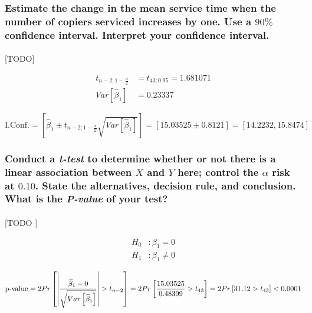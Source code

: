 \documentclass{article}
\begin{document}
      \subsubsection{Estimate the change in the mean service time when the number of copiers serviced increases by one. Use a $90\%$ confidence interval. Interpret your confidence interval.}
      \label{sec:copiers-2.5a}

        \paragraph{}
        [TODO]

        \begin{align}
          t_{n-2;1-\frac{\alpha}{2}} &= t_{43;0.95} = 1.681071\\
          Var\left[\widehat{\beta}_1\right] &= 0.23337
        \end{align}

        \begin{equation}
          \text{I.Conf.}
          = \left[\widehat{\beta}_1 \pm t_{n-2;1-\frac{\alpha}{2}}\sqrt{Var\left[\widehat{\beta}_1\right]}\right]
          = \left[15.03525 \pm 0.8121\right]
          = \left[14.2232, 15.8474\right]
        \end{equation}

      \subsubsection{Conduct a \emph{t-test} to determine whether or not there is a linear association between $X$ and $Y$ here; control the $\alpha$ risk at $0.10$. State the alternatives, decision rule, and conclusion. What is the \emph{P-value} of your test?}
      \label{sec:copiers-2.5b}

        \paragraph{}
        [TODO ]

        \begin{equation}
          \begin{split}
            H_0&: \beta_1 = 0 \\
            H_1&: \beta_1 \neq 0
          \end{split}
        \end{equation}

        \begin{equation}
            \text{p-value}
            = 2Pr\left[\left|\frac{\widehat{\beta}_1 - 0}{\sqrt{Var\left[\widehat{\beta}_1\right]}}\right| > t_{n-2}\right]
            = 2Pr\left[\frac{15.03525}{0.48309} > t_{43}\right]
            = 2Pr\left[31.12 > t_{43}\right]
            < 0.0001
        \end{equation}
\end{document}
